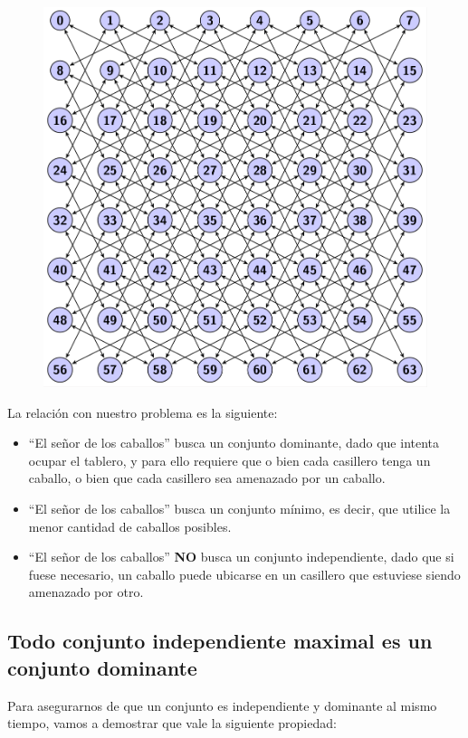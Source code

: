   \begin{figure}[h!]
   \begin{center}
 	\includegraphics[scale=0.4]{imagenes/tablero8x8.png}
   \end{center}
 \end{figure}

\newpage

La relación con nuestro problema es la siguiente:
\begin{itemize}
	\item ``El se\~nor de los caballos'' busca un conjunto dominante, dado que intenta ocupar el tablero, y para ello requiere que o bien cada casillero tenga un caballo, o bien que cada casillero sea amenazado por un caballo.
	\item ``El se\~nor de los caballos'' busca un conjunto m\'inimo, es decir, que utilice la menor cantidad de caballos posibles.
	\item ``El se\~nor de los caballos'' \textbf{NO} busca un conjunto independiente, dado que si fuese necesario, un caballo puede ubicarse en un casillero que estuviese siendo amenazado por otro.
	
\end{itemize}
\subsection{Todo conjunto independiente maximal es un conjunto dominante}
Para asegurarnos de que un conjunto es independiente y dominante al mismo tiempo, vamos a demostrar que vale la siguiente propiedad:\\

